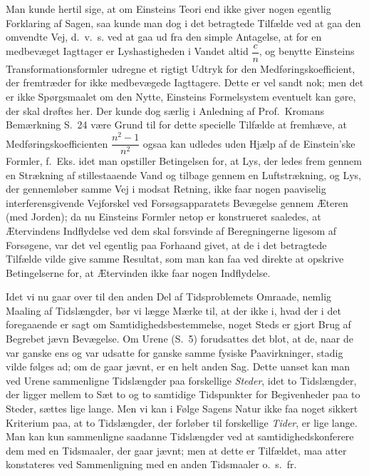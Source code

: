 \documentclass[12pt,a4paper]{article}
\newcommand{\opage}[1]{\marginnote{\footnotesize\textit{[#1]}}}
\begin{document}
Man kunde hertil sige, at om Einsteins Teori end ikke giver nogen egentlig
Forklaring af Sagen, saa kunde man dog i det betragtede Tilfælde ved at gaa den
omvendte Vej, d.~v.~s. ved at gaa ud fra den simple Antagelse, at for en
medbevæget Iagttager er Lyshastigheden i Vandet altid $\dfrac{c}{n}$, og
benytte Einsteins Transformationsformler udregne et rigtigt Udtryk for den
Medføringskoefficient, der fremtræder for ikke medbevægede Iagttagere. Dette er
vel sandt nok; men det er ikke Spørgsmaalet om den Nytte, Einsteins
Formelsystem eventuelt kan gøre, der skal drøftes her. Der kunde dog særlig i
Anledning af Prof.\ Kromans Bemærkning S.~24 være Grund til for dette specielle
Tilfælde at fremhæve, at Medføringskoefficienten $\dfrac{n^{2}-1}{n^{2}}$ ogsaa
kan udledes uden Hjælp af de Einstein'ske Formler, f.~Eks. idet man opstiller
Betingelsen for, at Lys, der ledes frem gennem en Strækning af stillestaaende
Vand og tilbage gennem en Luftstrækning, og Lys, der gennemløber samme Vej i
modsat Retning, ikke faar nogen paaviselig interferensgivende Vejforskel ved
Forsøgsapparatets Bevægelse gennem Æteren (med Jorden); da nu Einsteins Formler
netop er konstrueret saaledes, at \guillemotleft
Ætervindens\guillemotright{} Indflydelse ved dem skal forsvinde af
Beregningerne ligesom af Forsøgene, var det vel egentlig paa Forhaand givet, at
de i det betragtede Tilfælde vilde give samme Resultat, som man kan faa ved
direkte at opskrive Betingelserne for, at Ætervinden ikke faar nogen
Indflydelse.

Idet vi nu gaar over til den anden Del af Tidsproblemets Omraade, nemlig
Maaling af Tidslængder, bør vi lægge Mærke til, at der ikke i, hvad der i det
foregaaende er sagt om Samtidighedsbestemmelse, noget Steds er gjort Brug af
Begrebet jævn Bevægelse. Om Urene (S.~5) forudsattes det blot, at de, naar de
var ganske ens og var udsatte for ganske samme fysiske Paavirkninger, stadig
vilde følges ad; om de gaar jævnt, er en helt anden Sag. Dette uanset kan man
ved Urene sammenligne Tidslængder paa forskellige \emph{Steder}, idet to
Tidslængder, der ligger mellem to Sæt to og to
\opage{11} samtidige Tidspunkter for Begivenheder paa to Steder, sættes lige lange. Men vi
kan i Følge Sagens Natur ikke faa noget sikkert Kriterium paa, at to
Tidslængder, der forløber til forskellige \emph{Tider}, er lige lange. Man kan
kun sammenligne saadanne Tidslængder ved at \guillemotleft
samtidighedskonferere\guillemotright{} dem med en Tidsmaaler, der gaar jævnt;
men at dette er Tilfældet, maa atter konstateres ved Sammenligning med en anden
Tidsmaaler o.~s.~fr.
\end{document}
